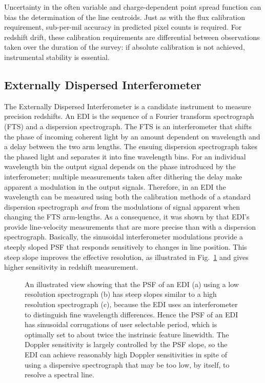 \documentclass[preprint2, 10pt]{aastex}
\begin{document}
{Uncertainty in the often variable and charge-dependent point spread function can
bias the determination of the line centroids.  Just as with the flux calibration requirement, sub-per-mil accuracy in predicted pixel counts
is required.  For redshift drift, these calibration requirements are differential between observations taken
over the duration of the survey: if absolute calibration is not achieved, instrumental stability is essential.


\subsection{Externally Dispersed Interferometer} 

The Externally Dispersed Interferometer \citep[EDI;][]{2003PASP..115..255E} is a candidate instrument to measure precision redshifts. 
An EDI is the sequence of a Fourier transform spectrograph (FTS) and a dispersion spectrograph.  The FTS is an interferometer that shifts
the phase of incoming coherent light
by an amount dependent on wavelength and a  delay between the two arm lengths.
The ensuing dispersion spectrograph takes the phased light and separates it into fine wavelength bins.
For an individual wavelength bin the output signal depends on the phase introduced by the interferometer; multiple
measurements taken after dithering the delay  make apparent a modulation in the output signals.
Therefore, in an EDI the wavelength can be measured using both the calibration methods of a standard dispersion
spectrograph {\it and\/} from the modulations of signal apparent when changing the FTS arm-lengths.   As a consequence,
it was shown by
\citet{2003PASP..115..255E} that EDI's provide line-velocity measurements that are more precise than with a dispersion spectrograph. 
Basically, the sinusoidal interferometer modulations 
provide a steeply sloped PSF that responds sensitively to changes in 
line position. This steep slope improves the effective resolution, as 
illustrated in Fig.~\ref{fig:edipsf} and gives 
higher sensitivity in redshift measurement.


\begin{figure}[t]
   \centering
   \caption{An illustrated view showing that 
the PSF of an EDI (a) using a low resolution spectrograph (b) has steep slopes similar to a high resolution spectrograph (c), because the EDI uses an interferometer to distinguish fine wavelength differences.  Hence the PSF of an EDI has sinusoidal corrugations of user selectable period, which is optimally set to about twice the instrinsic feature linewidth.  The Doppler sensitivity is largely controlled by the PSF slope, so the EDI can achieve reasonably high Doppler sensitivities in spite of using a dispersive spectrograph that may be too low, by itself, to resolve a spectral line. 
\label{fig:edipsf}}
\end{figure}


}
\end{document}
